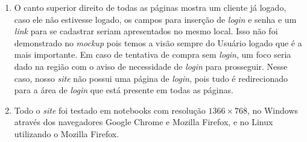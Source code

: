 \begin{enumerate}
	\item O canto superior direito de todas as páginas mostra um cliente já logado, caso ele não estivesse logado, os campos para inserção de \emph{login} e senha e um \emph{link} para se cadastrar seriam apresentados no mesmo local. Isso não foi demonstrado no \emph{mockup} pois temos a visão sempre do Usuário logado que é a mais importante. Em caso de tentativa de compra sem \emph{login}, um foco seria dado na região com o aviso de necessidade de \emph{login} para prosseguir. Nesse caso, nosso \emph{site} não possui uma página de \emph{login}, pois tudo é redirecionado para a área de \emph{login} que está presente em todas as páginas.

	\item Todo o \emph{site} foi testado em notebooks com resolução \(1366\times768\), no Windows através dos navegadores Google Chrome e Mozilla Firefox, e no Linux utilizando o Mozilla Firefox.
\end{enumerate}